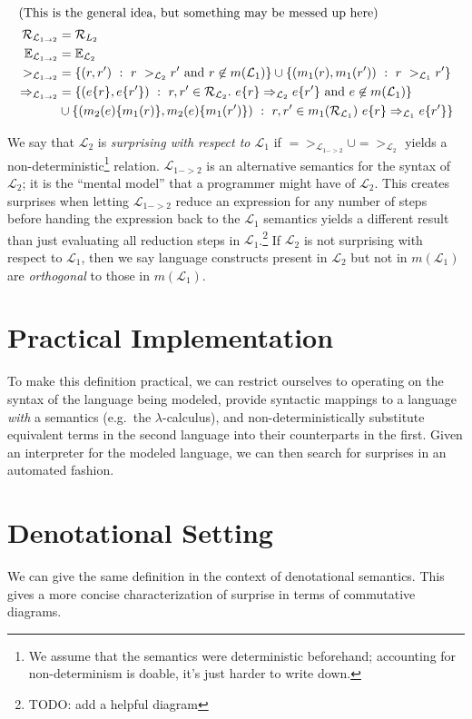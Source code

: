 \documentclass[12pt]{article}
\newcommand{\R}{\mathcal{R}}
\newcommand{\E}{\mathbb{E}}
\renewcommand{\L}{\mathcal{L}}
\begin{document}
\begin{align*}
\intertext{(This is the general idea, but something may be messed up here)}
  \R_{\L_{1 -> 2}} &= \R_{L_2} \\
  \E_{\L_{1 -> 2}} &= \E_{\L_2}  \\
  ~>_{\L_{1 -> 2}} &= \{(r, r')~:~r ~>_{\L_2}r' \text{ and } r \not\in m(\L_1)\} \cup 
  \{(m_1(r), m_1(r'))~:~r~>_{\L_1}r'\}\\
  =>_{\L_{1 -> 2}} &= \{(e\{r\}, e\{r'\})~:~r,r' \in \R_{\L_2}.~e\{r\} =>_{\L_2}e\{r'\} \text{ and } e \not\in m(\L_1)\}\\ 
  & \cup 
  \{(m_2(e)\{m_1(r)\}, m_2(e)\{m_1(r')\})~:~r,r' \in m_1(\R_{\L_1})~e\{r\}=>_{\L_1}e\{r'\}\}
\end{align*}

We say that $\L_2$ is \emph{surprising with respect to $\L_1$} if $=>_{\L_{1 ->
    2}} \cup =>_{\L_2}$ yields a non-deterministic\footnote{We assume that the
  semantics were deterministic beforehand; accounting for non-determinism is
  doable, it's just harder to write down.} relation. $\L_{1->2}$ is an alternative
semantics for the syntax of $\L_2$; it is the ``mental model'' that a programmer
might have of $\L_2$. This creates surprises when letting $\L_{1->2}$ reduce an
expression for any number of steps before handing the expression back to the
$\L_1$ semantics yields a different result than just evaluating all reduction
steps in $\L_1$.\footnote{TODO: add a helpful diagram} If $\L_2$ is not
surprising with respect to $\L_1$, then we say language constructs present in
$\L_2$ but not in $m(\L_1)$ are \textit{orthogonal} to those in $m(\L_1)$.


\section{Practical Implementation}

To make this definition practical, we can restrict ourselves to operating on the
syntax of the language being modeled, provide syntactic mappings to a language
\emph{with} a semantics (e.g.~the $\lambda$-calculus), and non-deterministically
substitute equivalent terms in the second language into their counterparts in
the first. Given an interpreter for the modeled language, we can then search for
surprises in an automated fashion.

\section{Denotational Setting}
We can give the same definition in the context of denotational semantics. This
gives a more concise characterization of surprise in terms of commutative
diagrams.
\end{document}
